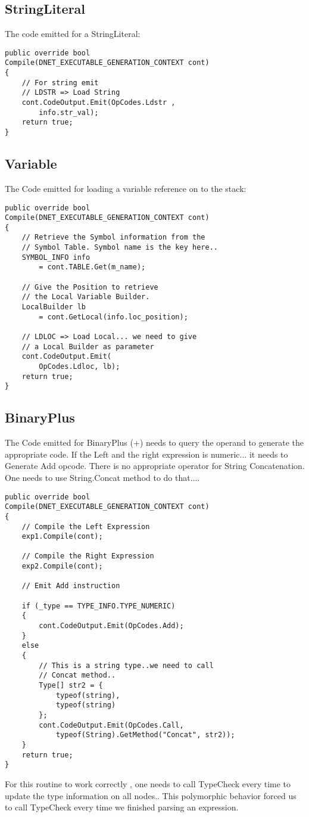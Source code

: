 \subsection{StringLiteral}
The code emitted for a StringLiteral:

\lstset{style=csharp}
\begin{lstlisting}
public override bool 
Compile(DNET_EXECUTABLE_GENERATION_CONTEXT cont)
{
	// For string emit
	// LDSTR => Load String
	cont.CodeOutput.Emit(OpCodes.Ldstr , 
		info.str_val);
	return true;
}
\end{lstlisting}
\subsection{Variable}
The Code emitted for loading a variable reference on to the stack:
\lstset{style=csharp}
\begin{lstlisting}
public override bool 
Compile(DNET_EXECUTABLE_GENERATION_CONTEXT cont)
{
	// Retrieve the Symbol information from the
	// Symbol Table. Symbol name is the key here..
	SYMBOL_INFO info 
		= cont.TABLE.Get(m_name);

	// Give the Position to retrieve 
	// the Local Variable Builder.
	LocalBuilder lb 
		= cont.GetLocal(info.loc_position);

	// LDLOC => Load Local... we need to give
	// a Local Builder as parameter
	cont.CodeOutput.Emit(
		OpCodes.Ldloc, lb);
	return true;
}
\end{lstlisting}

\subsection{BinaryPlus}
The Code emitted for BinaryPlus (+) needs to query the operand to generate the appropriate code. If the Left and the right expression is numeric... it needs to Generate Add opcode. There is no appropriate operator for String Concatenation. One needs to use String.Concat method to do that....

\lstset{style=csharp}
\begin{lstlisting}
public override bool 
Compile(DNET_EXECUTABLE_GENERATION_CONTEXT cont)
{
	// Compile the Left Expression
	exp1.Compile(cont);
	
	// Compile the Right Expression
	exp2.Compile(cont);

	// Emit Add instruction

	if (_type == TYPE_INFO.TYPE_NUMERIC)
	{
		cont.CodeOutput.Emit(OpCodes.Add);
	}
	else
	{
		// This is a string type..we need to call
		// Concat method..
		Type[] str2 = {
			typeof(string),
			typeof(string)
		};
		cont.CodeOutput.Emit(OpCodes.Call,
			typeof(String).GetMethod("Concat", str2));
	}
	return true;
}
\end{lstlisting}
For this routine to work correctly , one needs to call TypeCheck every time to update the type information on all nodes.. This polymorphic behavior forced us to call TypeCheck every time we finished parsing an expression.

